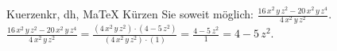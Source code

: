 \begin{MAufgabe}{Kuerzen}{kr, dh, MaTeX}
K\"urzen Sie soweit m\"oglich: $\frac{16\, x^2\, y\, z^2 - 20\, x^2\, y\, z^4}{4\, x^2\, y\, z^2}$.\\ 
\ifLsg\MLoesung
\quad $\frac{16\, x^2\, y\, z^2 - 20\, x^2\, y\, z^4}{4\, x^2\, y\, z^2}=\frac{(4\, x^2\, y\, z^2)\cdot(4 - 5\, z^2)}{(4\, x^2\, y\, z^2)\cdot(1)}=\frac{4 - 5\, z^2}{1}=4 - 5\, z^2$.\else\relax\fi
 \end{MAufgabe}